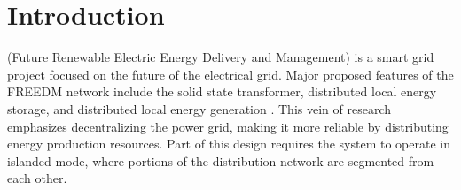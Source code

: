 \section{Introduction}
%
%



% 
% 
% 
% 
 (Future Renewable Electric Energy Delivery and Management) is a smart grid project focused on the future of the electrical grid.
Major proposed features of the FREEDM network include the solid state transformer, distributed local energy storage, and distributed local energy generation \cite{FREEDMMIGRATION}.
This vein of research emphasizes decentralizing the power grid, making it more reliable by distributing energy production resources.
Part of this design requires the system to operate in islanded mode, where portions of the distribution
network are segmented from each other.

